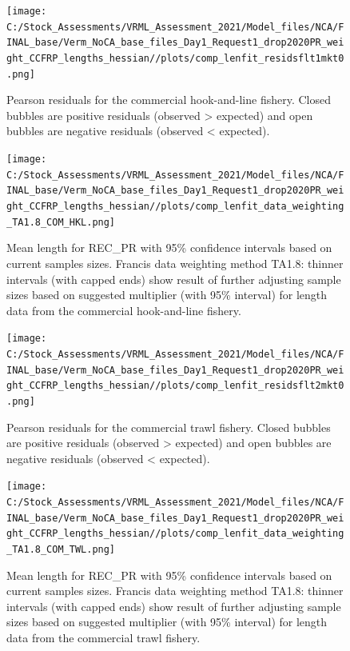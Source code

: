 \documentclass[
  english,
  a4paper,
]{article}
\begin{document}
\FloatBarrier

\begin{figure}
\centering
\texttt{[image: C:/Stock\_Assessments/VRML\_Assessment\_2021/Model\_files/NCA/FINAL\_base/Verm\_NoCA\_base\_files\_Day1\_Request1\_drop2020PR\_weight\_CCFRP\_lengths\_hessian//plots/comp\_lenfit\_residsflt1mkt0.png]}
\caption{Pearson residuals for the commercial hook-and-line fishery. Closed bubbles are positive residuals (observed \textgreater{} expected) and open bubbles are negative residuals (observed \textless{} expected).\label{fig:len-pearson-COM-HKL}}
\end{figure}

\begin{figure}
\centering
\texttt{[image: C:/Stock\_Assessments/VRML\_Assessment\_2021/Model\_files/NCA/FINAL\_base/Verm\_NoCA\_base\_files\_Day1\_Request1\_drop2020PR\_weight\_CCFRP\_lengths\_hessian//plots/comp\_lenfit\_data\_weighting\_TA1.8\_COM\_HKL.png]}
\caption{Mean length for REC\_PR with 95\% confidence intervals based on current samples sizes. Francis data weighting method TA1.8: thinner intervals (with capped ends) show result of further adjusting sample sizes based on suggested multiplier (with 95\% interval) for length data from the commercial hook-and-line fishery.\label{fig:mean-len-fit-COM-HKL}}
\end{figure}

\begin{figure}
\centering
\texttt{[image: C:/Stock\_Assessments/VRML\_Assessment\_2021/Model\_files/NCA/FINAL\_base/Verm\_NoCA\_base\_files\_Day1\_Request1\_drop2020PR\_weight\_CCFRP\_lengths\_hessian//plots/comp\_lenfit\_residsflt2mkt0.png]}
\caption{Pearson residuals for the commercial trawl fishery. Closed bubbles are positive residuals (observed \textgreater{} expected) and open bubbles are negative residuals (observed \textless{} expected).\label{fig:len-pearson-COM-TWL}}
\end{figure}

\begin{figure}
\centering
\texttt{[image: C:/Stock\_Assessments/VRML\_Assessment\_2021/Model\_files/NCA/FINAL\_base/Verm\_NoCA\_base\_files\_Day1\_Request1\_drop2020PR\_weight\_CCFRP\_lengths\_hessian//plots/comp\_lenfit\_data\_weighting\_TA1.8\_COM\_TWL.png]}
\caption{Mean length for REC\_PR with 95\% confidence intervals based on current samples sizes. Francis data weighting method TA1.8: thinner intervals (with capped ends) show result of further adjusting sample sizes based on suggested multiplier (with 95\% interval) for length data from the commercial trawl fishery.\label{fig:mean-len-fit-COM-TWL}}
\end{figure}
\end{document}
